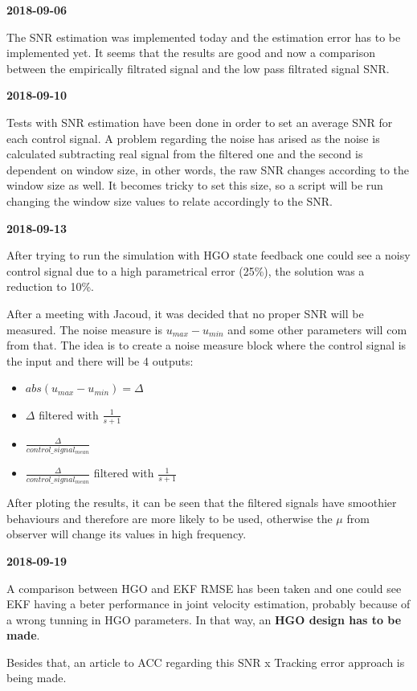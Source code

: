 \textbf{2018-09-06}

The SNR estimation was implemented today and the estimation error has to be implemented yet. It seems that the results are good and now a comparison between the empirically filtrated signal and the low pass filtrated signal SNR.

\textbf{2018-09-10}

Tests with SNR estimation have been done in order to set an average SNR for each control signal. A problem regarding the noise has arised as the noise is calculated subtracting real signal from the filtered one and the second is dependent on window size, in other words, the raw SNR changes according to the window size as well. It becomes tricky to set this size, so a script will be run changing the window size values to relate accordingly to the SNR.

\textbf{2018-09-13}

After trying to run the simulation with HGO state feedback one could see a noisy control signal due to a high parametrical error (25\%), the solution was a reduction to 10\%.

After a meeting with Jacoud, it was decided that no proper SNR will be measured. The noise measure is $u_{max} - u_{min}$ and some other parameters will com from that. The idea is to create a noise measure block where the control signal is the input and there will be 4 outputs:
\begin{itemize}
    \item $abs(u_{max} - u_{min}) = \Delta$
    \item $\Delta$ filtered with $\frac{1}{s + 1}$
    \item $\frac{\Delta}{control\_signal_{mean}}$
    \item $\frac{\Delta}{control\_signal_{mean}}$ filtered with $\frac{1}{s + 1}$
\end{itemize}

After ploting the results, it can be seen that the filtered signals have smoothier behaviours and therefore are more likely to be used, otherwise the $\mu$ from observer will change its values in high frequency.

\textbf{2018-09-19}

A comparison between HGO and EKF RMSE has been taken and one could see EKF having a beter performance in joint velocity estimation, probably because of a wrong tunning in HGO parameters. In that way, an \textbf{HGO design has to be made}.

Besides that, an article to ACC regarding this SNR x Tracking error approach is being made.